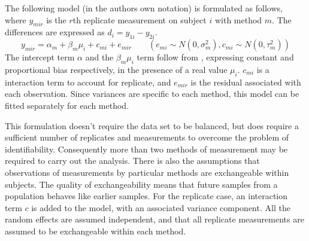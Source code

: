 \documentclass[12pt, a4paper]{report}
\theoremstyle{plain}
\theoremstyle{definition}
\theoremstyle{remark}
\begin{document}
	
	The following model (in the authors own notation) is
	formulated as follows, where $y_{mir}$ is the $r$th replicate
	measurement on subject $i$ with method $m$. The differences are expressed as $d_{i} = y_{1i} - y_{2i}$.
	\begin{equation}
	y_{mir}  = \alpha_{m} + \beta_{m}\mu_{i} + c_{mi} + e_{mir} \qquad
	( e_{mi} \sim N(0,\sigma^{2}_{m}), c_{mi} \sim N(0,\tau^{2}_{m}))
	\end{equation}
	The intercept term $\alpha$ and the $\beta_{m}\mu_{i}$ term follow from \citet{DunnSEME}, expressing constant and proportional bias
	respectively, in the presence of a real value $\mu_{i}$. $c_{mi}$ is a interaction term to account for replicate, and $e_{mir}$ is the residual associated with each observation. Since variances are specific to each method, this model can be
	fitted separately for each method.
	
This formulation doesn't require the data set to be balanced, but does require a sufficient number of replicates and measurements to overcome the problem of identifiability. Consequently more than two methods of measurement may
be required to carry out the analysis. There is also the assumptions that observations of measurements by particular methods are exchangeable within subjects. The quality of exchangeability means that future samples from a population behaves like earlier samples. For the replicate case, an interaction term $c$ is added to the model, with an associated variance component. All the random effects are assumed independent, and that all replicate measurements are assumed to be exchangeable within each method. 
	
	
\end{document}
